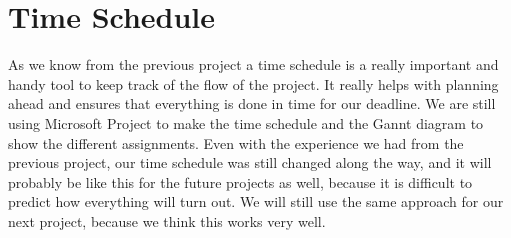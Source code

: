 \section{Time Schedule}
As we know from the previous project a time schedule is a really important and handy tool to keep track of the flow of the project. It really helps with planning ahead and ensures that everything is done in time for our deadline. We are still using Microsoft Project to make the time schedule and the Gannt diagram to show the different assignments. Even with the experience we had from the previous project, our time schedule was still changed along the way, and it will probably be like this for the future projects as well, because it is difficult to predict how everything will turn out.
We will still use the same approach for our next project, because we think this works very well.